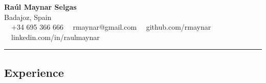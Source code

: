 \documentclass[11pt,letterpaper]{article}
\begin{document}
\begin{center}
	{\LARGE \textbf{Raúl Maynar Selgas}}\\
	Badajoz, Spain
	\vspace{0.05cm}
	\\
	\raisebox{-0.2\height} {\Large \faPhoneSquare} \ \  +34 695 366 666 \hfill\raisebox{-0.2\height}{\Large \faEnvelopeSquare} \ \ rmaynar@gmail.com \hfill \raisebox{-0.2\height}{\Large \faGithubSquare} \ \ github.com/rmaynar \hfill \raisebox{-0.2\height}{\Large \faLinkedinSquare} \ \ linkedin.com/in/raulmaynar
\end{center}

\hrule
\vspace{-1em}
\subsection*{\Large Experience}
\end{document}
